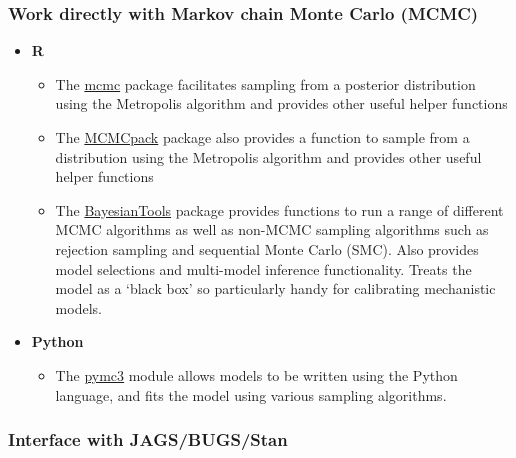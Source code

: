 \documentclass[
]{book}
\providecommand{\tightlist}{%
  \setlength{\itemsep}{0pt}\setlength{\parskip}{0pt}}
\begin{document}
\hypertarget{work-directly-with-markov-chain-monte-carlo-mcmc}{%
\subsubsection{Work directly with Markov chain Monte Carlo (MCMC)}\label{work-directly-with-markov-chain-monte-carlo-mcmc}}

\begin{itemize}
\tightlist
\item
  \textbf{R}

  \begin{itemize}
  \tightlist
  \item
    The \href{https://cran.r-project.org/web/packages/mcmc/index.html}{mcmc} package facilitates sampling from a posterior distribution using the Metropolis algorithm and provides other useful helper functions\\
  \item
    The \href{https://cran.r-project.org/web/packages/MCMCpack/index.html}{MCMCpack} package also provides a function to sample from a distribution using the Metropolis algorithm and provides other useful helper functions\\
  \item
    The \href{https://cran.r-project.org/web/packages/BayesianTools/index.html}{BayesianTools} package provides functions to run a range of different MCMC algorithms as well as non-MCMC sampling algorithms such as rejection sampling and sequential Monte Carlo (SMC). Also provides model selections and multi-model inference functionality. Treats the model as a `black box' so particularly handy for calibrating mechanistic models.
  \end{itemize}
\item
  \textbf{Python}

  \begin{itemize}
  \tightlist
  \item
    The \href{https://docs.pymc.io/}{pymc3} module allows models to be written using the Python language, and fits the model using various sampling algorithms.
  \end{itemize}
\end{itemize}

\hypertarget{interface-with-jagsbugsstan}{%
\subsubsection{Interface with JAGS/BUGS/Stan}\label{interface-with-jagsbugsstan}}
\end{document}
